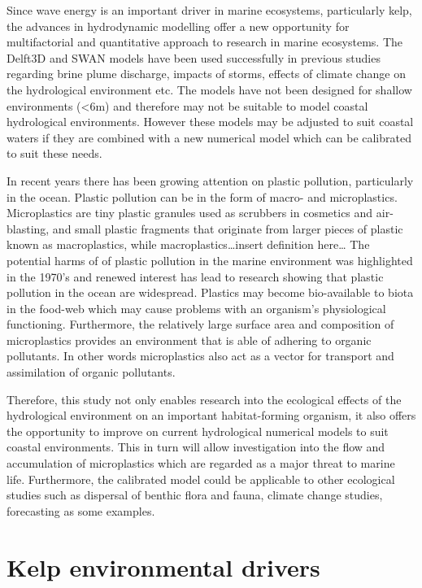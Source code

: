 \documentclass[
]{article}
\begin{document}
Since wave energy is an important driver in marine ecosystems,
particularly kelp, the advances in hydrodynamic modelling offer a new
opportunity for multifactorial and quantitative approach to research in
marine ecosystems. The Delft3D and SWAN models have been used
successfully in previous studies regarding brine plume discharge,
impacts of storms, effects of climate change on the hydrological
environment etc. The models have not been designed for shallow
environments (\textless6m) and therefore may not be suitable to model
coastal hydrological environments. However these models may be adjusted
to suit coastal waters if they are combined with a new numerical model
which can be calibrated to suit these needs.

In recent years there has been growing attention on plastic pollution,
particularly in the ocean. Plastic pollution can be in the form of
macro- and microplastics. Microplastics are tiny plastic granules used
as scrubbers in cosmetics and air-blasting, and small plastic fragments
that originate from larger pieces of plastic known as macroplastics,
while macroplastics\ldots insert definition here\ldots{} The potential
harms of of plastic pollution in the marine environment was highlighted
in the 1970's and renewed interest has lead to research showing that
plastic pollution in the ocean are widespread. Plastics may become
bio-available to biota in the food-web which may cause problems with an
organism's physiological functioning. Furthermore, the relatively large
surface area and composition of microplastics provides an environment
that is able of adhering to organic pollutants. In other words
microplastics also act as a vector for transport and assimilation of
organic pollutants.

Therefore, this study not only enables research into the ecological
effects of the hydrological environment on an important habitat-forming
organism, it also offers the opportunity to improve on current
hydrological numerical models to suit coastal environments. This in turn
will allow investigation into the flow and accumulation of microplastics
which are regarded as a major threat to marine life. Furthermore, the
calibrated model could be applicable to other ecological studies such as
dispersal of benthic flora and fauna, climate change studies,
forecasting as some examples.

\hypertarget{kelp-environmental-drivers}{%
\section{Kelp environmental drivers}\label{kelp-environmental-drivers}}
\end{document}
